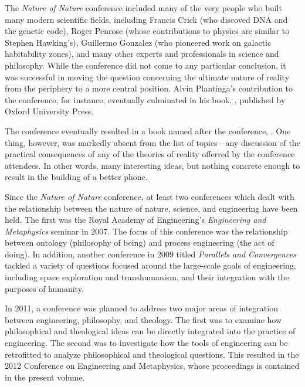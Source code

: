 The \textit{Nature of Nature} conference included many of the very people who built many modern scientific fields, including Francis Crick (who discoved DNA and the genetic code), Roger Penrose (whose contributions to physics are similar to Stephen Hawking's), Guillermo Gonzalez (who pioneered work on galactic habitability zones), and many other experts and professionals in science and philosophy.  While the conference did not come to any particular conclusion, it was successful in moving the question concerning the ultimate nature of reality from the periphery to a more central position.  Alvin Plantinga's contribution to the conference, for instance, eventually culminated in his book, , published by Oxford University Press.\citep{plantinga2011}\citep{plantinga2011b}

The conference eventually resulted in a book named after the conference, .\citep{natnat2011}  One thing, however, was markedly absent from the list of topics---any discussion of the practical consequences of any of the theories of reality offerred by the conference attendees.  In other words, many interesting ideas, but nothing concrete enough to result in the building of a better phone.

Since the \textit{Nature of Nature} conference, at least two conferences which dealt with the relationship between the nature of nature, science, and engineering have been held.
The first was the Royal Academy of Engineering's \textit{Engineering and Metaphysics} seminar in 2007.  The focus of this conference was the relationship between ontology (philosophy of being) and process engineering (the act of doing).  In addition, another conference in 2009 titled \textit{Parallels and Convergences} tackled a variety of questions focused around the large-scale goals of engineering, including space exploration and transhumanism, and their integration with the purposes of humanity.  

In 2011, a conference was planned to address two major areas of integration between engineering, philosophy, and theology.  The first was to examine how philosophical and theological ideas can be directly integrated into the practice of engineering.  The second was to investigate how the tools of engineering can be retrofitted to analyze philosophical and theological questions.  This resulted in the 2012 Conference on Engineering and Metaphysics, whose proceedings is contained in the present volume.


